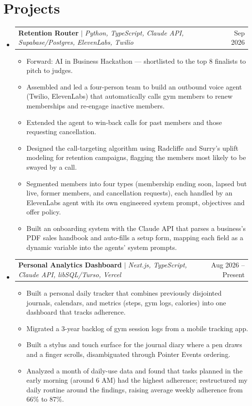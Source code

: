 \documentclass[letterpaper,11pt]{article}
\makeatletter
\newcommand{\resumeItem}[1]{\item\small{{#1 \vspace{-2pt}}}}
\newcommand{\resumeProjectHeading}[2]{
    \item
    \begin{tabular*}{0.97\textwidth}{l@{\extracolsep{\fill}}r}
      \small#1 & #2 \\
    \end{tabular*}\vspace{-7pt}
}
\newcommand{\resumeSubHeadingListStart}{\begin{itemize}[leftmargin=0.15in, label={}]}
\newcommand{\resumeSubHeadingListEnd}{\end{itemize}}
\newcommand{\resumeItemListStart}{\begin{itemize}}
\newcommand{\resumeItemListEnd}{\end{itemize}\vspace{-5pt}}
\makeatother
\begin{document}
\section{Projects}
    \resumeSubHeadingListStart
      \resumeProjectHeading
          {\textbf{Retention Router} $|$ \emph{Python, TypeScript, Claude API, Supabase/Postgres, ElevenLabs, Twilio}}{Sep 2026}
          \resumeItemListStart
            \resumeItem{Forward: AI in Business Hackathon --- shortlisted to the top 8 finalists to pitch to judges.}
            \resumeItem{Assembled and led a four-person team to build an outbound voice agent (Twilio, ElevenLabs) that automatically calls gym members to renew memberships and re-engage inactive members.}
            \resumeItem{Extended the agent to win-back calls for past members and those requesting cancellation.}
            \resumeItem{Designed the call-targeting algorithm using Radcliffe and Surry's uplift modeling for retention campaigns, flagging the members most likely to be swayed by a call.}
            \resumeItem{Segmented members into four types (membership ending soon, lapsed but live, former members, and cancellation requests), each handled by an ElevenLabs agent with its own engineered system prompt, objectives and offer policy.}
            \resumeItem{Built an onboarding system with the Claude API that parses a business's PDF sales handbook and auto-fills a setup form, mapping each field as a dynamic variable into the agents' system prompts.}
          \resumeItemListEnd
      \resumeProjectHeading
          {\textbf{Personal Analytics Dashboard} $|$ \emph{Next.js, TypeScript, Claude API, libSQL/Turso, Vercel}}{Aug 2026 -- Present}
          \resumeItemListStart
            \resumeItem{Built a personal daily tracker that combines previously disjointed journals, calendars, and metrics (steps, gym logs, calories) into one dashboard that tracks adherence.}
            \resumeItem{Migrated a 3-year backlog of gym session logs from a mobile tracking app.}
            \resumeItem{Built a stylus and touch surface for the journal diary where a pen draws and a finger scrolls, disambiguated through Pointer Events ordering.}
            \resumeItem{Analyzed a month of daily-use data and found that tasks planned in the early morning (around 6 AM) had the highest adherence; restructured my daily routine around the findings, raising average weekly adherence from 66\% to 87\%.}
          \resumeItemListEnd
    \resumeSubHeadingListEnd

\end{document}
